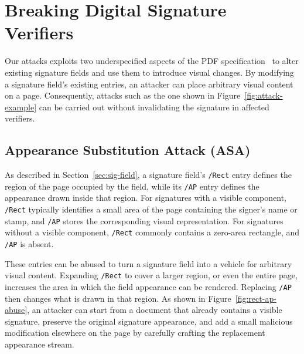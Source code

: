 \documentclass[12pt]{article}
\begin{document}
\section{Breaking Digital Signature Verifiers} \label{sec:attack-defintions}

Our attacks exploits two underspecified aspects of the PDF specification~\cite{iso32000-2} to alter existing signature fields and use them to introduce visual changes. By modifying a signature field's existing entries, an attacker can place arbitrary visual content on a page. Consequently, attacks such as the one shown in Figure~\ref{fig:attack-example} can be carried out without invalidating the signature in affected verifiers.

\subsection{Appearance Substitution Attack (ASA)}



As described in Section~\ref{sec:sig-field}, a signature field's \texttt{/Rect} entry defines the region of the page occupied by the field, while its \texttt{/AP} entry defines the appearance drawn inside that region. For signatures with a visible component, \texttt{/Rect} typically identifies a small area of the page containing the signer's name or stamp, and \texttt{/AP} stores the corresponding visual representation. For signatures without a visible component, \texttt{/Rect} commonly contains a zero-area rectangle, and \texttt{/AP} is absent.

These entries can be abused to turn a signature field into a vehicle for arbitrary visual content. Expanding \texttt{/Rect} to cover a larger region, or even the entire page, increases the area in which the field appearance can be rendered. Replacing \texttt{/AP} then changes what is drawn in that region. As shown in Figure~\ref{fig:rect-ap-abuse}, an attacker can start from a document that already contains a visible signature, preserve the original signature appearance, and add a small malicious modification elsewhere on the page by carefully crafting the replacement appearance stream.
\end{document}
